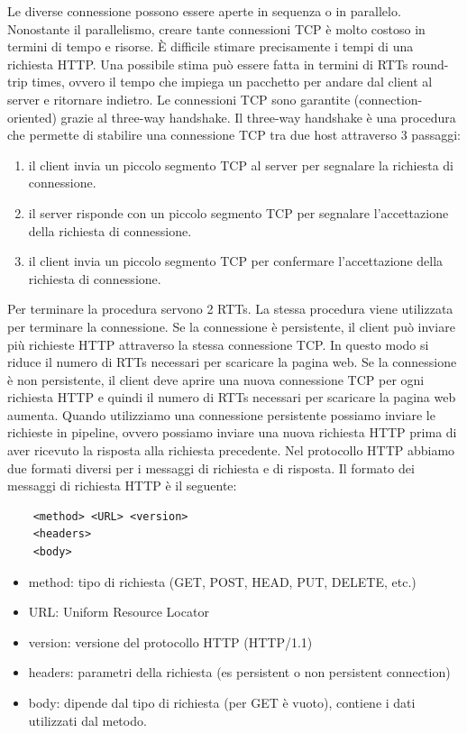 \documentclass[12pt]{article}
\begin{document}
Le diverse connessione possono essere aperte in sequenza o in parallelo.
Nonostante il parallelismo, creare tante connessioni TCP è molto costoso in termini di tempo e risorse.
È difficile stimare precisamente i tempi di una richiesta HTTP.
Una possibile stima può essere fatta in termini di RTTs round-trip times, ovvero il tempo che impiega un pacchetto per andare dal client al server e ritornare indietro.
Le connessioni TCP sono garantite (connection-oriented) grazie al three-way handshake.
Il three-way handshake è una procedura che permette di stabilire una connessione TCP tra due host attraverso 3 passaggi:
\begin{enumerate}
    \item il client invia un piccolo segmento TCP al server per segnalare la richiesta di connessione.
    \item il server risponde con un piccolo segmento TCP per segnalare l'accettazione della richiesta di connessione.
    \item il client invia un piccolo segmento TCP per confermare l'accettazione della richiesta di connessione.
\end{enumerate}
Per terminare la procedura servono 2 RTTs. La stessa procedura viene utilizzata per terminare la connessione.
Se la connessione è persistente, il client può inviare più richieste HTTP attraverso la stessa connessione TCP.
In questo modo si riduce il numero di RTTs necessari per scaricare la pagina web.
Se la connessione è non persistente, il client deve aprire una nuova connessione TCP per ogni richiesta HTTP e quindi il numero di RTTs necessari per scaricare la pagina web aumenta.
Quando utilizziamo una connessione persistente possiamo inviare le richieste in pipeline, ovvero possiamo inviare una nuova richiesta HTTP prima di aver ricevuto la risposta alla richiesta precedente.
Nel protocollo HTTP abbiamo due formati diversi per i messaggi di richiesta e di risposta.
Il formato dei messaggi di richiesta HTTP è il seguente:
\begin{verbatim}
    <method> <URL> <version>
    <headers>
    <body>
\end{verbatim}
\begin{itemize}
    \item method: tipo di richiesta (GET, POST, HEAD, PUT, DELETE, etc.)
    \item URL: Uniform Resource Locator
    \item version: versione del protocollo HTTP (HTTP/1.1)
    \item headers: parametri della richiesta (es persistent o non persistent connection)
    \item body: dipende dal tipo di richiesta (per GET è vuoto), contiene i dati utilizzati dal metodo.
\end{itemize}
\end{document}

